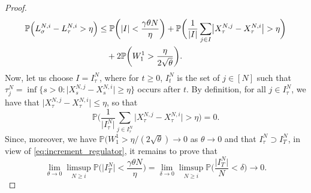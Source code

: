 \documentclass[11pt, a4paper]{article}
\theoremstyle{plain}
\theoremstyle{definition}
\theoremstyle{remark}
\numberwithin{equation}{section}
\newcommand{\pr}{\mathbb{P}}
\newcommand{\define}{\mathpunct{:}}
\begin{document}
\begin{proof}
\begin{align*}
    \pr\Bigl(L^{N, i}_{\sigma} - L^{N, i}_{\tau} > \eta\Bigr) &\leq \pr\biggl(\lvert I\rvert < \frac{\gamma \theta N}{\eta}\biggr) + \pr\biggl(\frac{1}{\lvert I \rvert}\sum_{j \in I} \bigl\lvert X^{N, j}_{\tau} - X^{N, i}_{\tau}\bigr\rvert > \eta\biggr) \\
    &\ \ \ + 2\pr\biggl(W^1_1 > \frac{\eta}{2 \sqrt{\theta}}\biggr).
\end{align*}
Now, let us choose $I = I^N_{\tau}$, where for $t \geq 0$, $I^N_t$ is the set of $j \in [N]$ such that $\tau^N_j = \inf\{s > 0 \define \lvert X^{N, j}_s - X^{N, i}_s\rvert \geq \eta\}$ occurs after $t$. By definition, for all $j \in I^N_{\tau}$, we have that $\lvert X^{N, j}_{\tau} - X^{N, i}_{\tau}\rvert \leq \eta$, so that
\begin{equation*}
    \pr\biggl(\frac{1}{\lvert I^N_{\tau} \rvert}\sum_{j \in I^N_{\tau}} \bigl\lvert X^{N, j}_{\tau} - X^{N, i}_{\tau}\bigr\rvert > \eta\biggr) = 0.
\end{equation*}
Since, moreover, we have $\pr(W^1_1 > \eta/(2\sqrt{\theta}) \to 0$ as $\theta \to 0$ and that $I^N_{\tau} \supset I^N_T$, in view of \eqref{eq:increment_regulator}, it remains to prove that
\begin{equation*}
    \lim_{\theta \to 0} \limsup_{N \geq i} \pr\biggl(\lvert I^N_T\rvert < \frac{\gamma \theta N}{\eta}\biggr) = \lim_{\delta \to 0} \limsup_{N \geq i} \pr\biggl(\frac{\lvert I^N_T\rvert}{N} < \delta\biggr) \to 0.
\end{equation*}


\end{proof}
\end{document}
